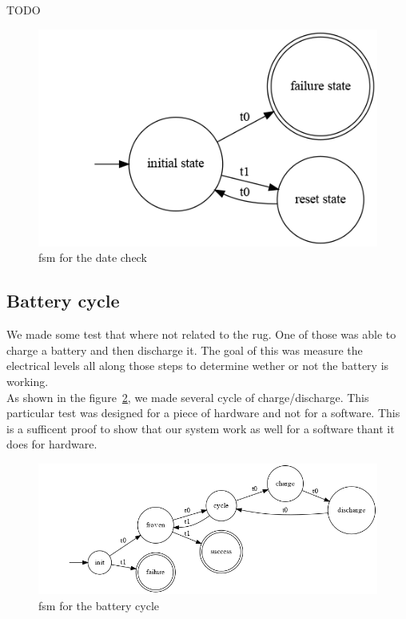 \documentclass[12pt]{article}
\begin{document}
TODO
\begin{figure}
    \centering
    \includegraphics[scale=0.6]{graph/TimeoutCheck}
    \caption{\gls{fsm} for the date check}
    \label{datecheck}
\end{figure}

\subsection{Battery cycle}

We made some test that where not related to the \gls{rug}. One of those was able to charge a battery and then discharge it. The goal of this was measure the electrical levels all along those steps to determine wether or not the battery is working.\\

As shown in the figure~\ref{battcycle2}, we made several cycle of charge/discharge. This particular test was designed for a piece of hardware and not for a software. This is a sufficent proof to show that our system work as well for a software thant it does for hardware.

\begin{figure}
    \centering
    \includegraphics[scale=0.4]{graph/BatteryCycle.png}
    \caption{\gls{fsm} for the battery cycle}
    \label{battcycle2}
\end{figure}

\clearpage
{}

{}

\clearpage
\printglossaries
\end{document}
